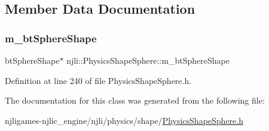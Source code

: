 \subsection{Member Data Documentation}
\mbox{\label{classnjli_1_1_physics_shape_sphere_aeb4452f79c06b476a09bc23980abec57}} 
\subsubsection{\texorpdfstring{m\+\_\+bt\+Sphere\+Shape}{m\_btSphereShape}}
{\footnotesize\ttfamily bt\+Sphere\+Shape$\ast$ njli\+::\+Physics\+Shape\+Sphere\+::m\+\_\+bt\+Sphere\+Shape\hspace{0.3cm}{\ttfamily [private]}}



Definition at line 240 of file Physics\+Shape\+Sphere.\+h.



The documentation for this class was generated from the following file\+:\begin{DoxyCompactItemize}
\item 
njligames-\/njlic\+\_\+engine/njli/physics/shape/\mbox{\hyperlink{_physics_shape_sphere_8h}{Physics\+Shape\+Sphere.\+h}}\end{DoxyCompactItemize}
